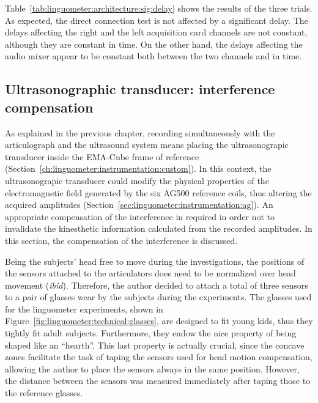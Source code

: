 Table~\ref{tab:linguometer:architecture:sig:delay} shows the results of the
three trials. As expected, the direct connection test is not affected by a
significant delay. The delays affecting the right and the left acquisition card
channels are not constant, although they are constant in time. 
On the other hand, the delays affecting the audio mixer appear to be constant
both between the two channels and in time.
\subsection{Ultrasonographic transducer: interference compensation}
\label{sec:linguometer:technical:interference}
As explained in the previous chapter, recording simultaneously with the
articulograph and the ultrasound system means placing the ultrasonograpic 
transducer inside the EMA-Cube frame of reference
(Section~\ref{ch:linguometer:instrumentation:custom}).
In this context, the ultrasonograpic transducer could  
modify the physical properties of the electromagnetic field generated by the six
AG500 reference coils, thus altering the acquired amplitudes
(Section~\ref{sec:linguometer:instrumentation:ag}).
An appropriate compensation of the interference in required in order not to
invalidate the kinesthetic information calculated from the recorded amplitudes.
In this section, the compensation of the interference is discussed.

Being the subjects' head free to move during the investigations, the positions
of the sensors attached to the articulators does need to be normalized over head
movement (\emph{ibid}).
Therefore, the author decided to attach a total of three sensors to a pair of 
glasses wear by the subjects during the experiments.
The glasses used for the linguometer experiments, shown in 
Figure~\ref{fig:linguometer:technical:glasses}, are designed to
fit young kids, thus they tightly fit adult subjects.
Furthermore, they endow the nice property of being shaped like an ``hearth''.
This last property is actually crucial, since the concave
zones facilitate the task of taping the sensors used for head motion
compensation, allowing the author to place the sensors always in the same
position.
However, the distance between the sensors was measured immediately after taping
those to the reference glasses.

